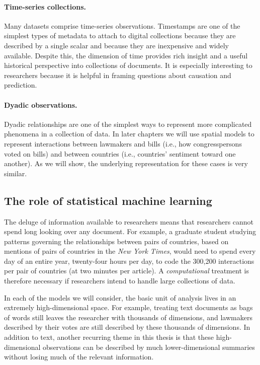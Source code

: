 \paragraph{Time-series collections.}  Many datasets comprise
time-series observations.  Timestamps are one of the simplest types of
metadata to attach to digital collections because they are described
by a single scalar and because they are inexpensive and widely
available.  Despite this, the dimension of time provides rich insight
and a useful historical perspective into collections of documents.  It
is especially interesting to researchers because it is helpful in
framing questions about causation and prediction.

\paragraph{Dyadic observations.}  Dyadic relationships are one of the
simplest ways to represent more complicated phenomena in a collection
of data. In later chapters we will use spatial models to represent
interactions between lawmakers and bills (i.e., how congresspersons voted
on bills) and between countries (i.e., countries' sentiment
toward one another).  As we will show, the underlying representation
for these cases is very similar.

\subsection*{The role of statistical machine learning}

The deluge of information available to researchers means that
researchers cannot spend long looking over any document.  For example,
a graduate student studying patterns governing the relationships
between pairs of countries, based on mentions of pairs of countries in
the \emph{New York Times}, would need to spend every day of an entire
year, twenty-four hours per day, to code the 300,200 interactions per
pair of countries (at two minutes per article).  A
\emph{computational} treatment is therefore necessary if researchers
intend to handle large collections of data.

In each of the models we will consider, the basic unit of analysis
lives in an extremely high-dimensional space.  For example, treating
text documents as bags of words still leaves the researcher with
thousands of dimensions, and lawmakers described by their votes are
still described by these thousands of dimensions.  In addition to
text, another recurring theme in this thesis is that these
high-dimensional observations can be described by much
lower-dimensional summaries without losing much of the relevant
information.

